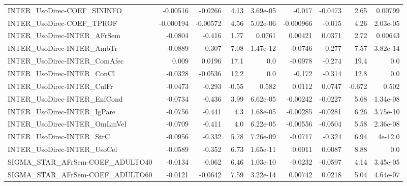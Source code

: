 \begin{tabular}{lrrrrrrrr}
INTER\_UsoDirec-COEF\_SININFO            &    -0.00516 &      -0.0266 &     4.13 & 3.69e-05 &     -0.017 &     -0.0473 &         2.65 &       0.00799 \\
INTER\_UsoDirec-COEF\_TPROF              &   -0.000194 &     -0.00572 &     4.56 & 5.02e-06 &  -0.000966 &      -0.015 &         4.26 &      2.03e-05 \\
INTER\_UsoDirec-INTER\_AFrSem            &     -0.0804 &       -0.416 &     1.77 &   0.0761 &    0.00421 &      0.0371 &         2.72 &       0.00643 \\
INTER\_UsoDirec-INTER\_AmbTr             &     -0.0889 &       -0.307 &     7.08 & 1.47e-12 &    -0.0746 &      -0.277 &         7.57 &      3.82e-14 \\
INTER\_UsoDirec-INTER\_ComAfec           &       0.009 &       0.0196 &     17.1 &      0.0 &    -0.0978 &      -0.274 &         19.4 &           0.0 \\
INTER\_UsoDirec-INTER\_ConCl             &     -0.0328 &      -0.0536 &     12.2 &      0.0 &     -0.172 &      -0.314 &         12.8 &           0.0 \\
INTER\_UsoDirec-INTER\_CulFr             &     -0.0473 &       -0.293 &    -0.55 &    0.582 &     0.0112 &      0.0747 &       -0.672 &         0.502 \\
INTER\_UsoDirec-INTER\_EnfCond           &     -0.0734 &       -0.436 &     3.99 & 6.62e-05 &   -0.00242 &     -0.0227 &         5.68 &      1.34e-08 \\
INTER\_UsoDirec-INTER\_IgPare            &     -0.0756 &       -0.441 &      4.3 & 1.68e-05 &   -0.00285 &     -0.0281 &         6.26 &      3.75e-10 \\
INTER\_UsoDirec-INTER\_OmLmVel           &     -0.0709 &       -0.411 &      4.0 & 6.22e-05 &   -0.00556 &     -0.0504 &         5.58 &      2.36e-08 \\
INTER\_UsoDirec-INTER\_StrC              &     -0.0956 &       -0.332 &     5.78 & 7.26e-09 &    -0.0717 &      -0.324 &         6.94 &       4e-12.0 \\
INTER\_UsoDirec-INTER\_UsoCel            &     -0.0589 &       -0.352 &     6.73 & 1.65e-11 &     0.0011 &      0.0087 &         8.88 &           0.0 \\
SIGMA\_STAR\_AFrSem-COEF\_ADULTO40        &     -0.0134 &       -0.062 &     6.46 & 1.03e-10 &    -0.0232 &     -0.0597 &         4.14 &      3.45e-05 \\
SIGMA\_STAR\_AFrSem-COEF\_ADULTO60        &     -0.0121 &      -0.0642 &     7.59 & 3.22e-14 &    0.00742 &      0.0218 &         5.04 &      4.64e-07 \\

\end{tabular}
